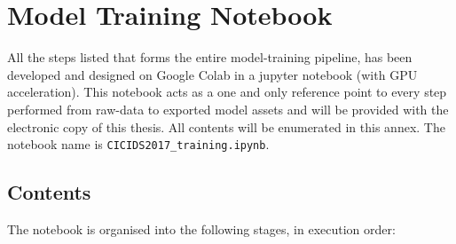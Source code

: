 
\chapter{Model Training Notebook}
\label{app:notebook}

All the steps listed that forms the entire model-training pipeline, has been developed and designed on Google Colab in a jupyter notebook (with GPU acceleration). This notebook acts as a one and only reference point to every step performed from raw-data to exported model assets and will be provided with the electronic copy of this thesis. All contents will be enumerated in this annex. The notebook name is \texttt{CICIDS2017\_training.ipynb}.

\section{Contents}
\label{app:notebook_contents}

The notebook is organised into the following stages, in execution order:

